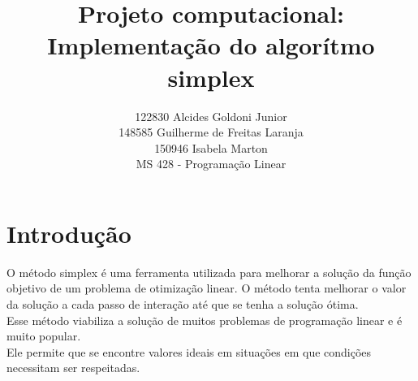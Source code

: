 \documentclass[a4paper]{article}
\title{Projeto computacional: Implementa\c{c}\~ao do algor\'itmo simplex}
\author{122830 Alcides Goldoni Junior\\
		148585 Guilherme de Freitas Laranja\\
		150946 Isabela Marton\\
	\small MS 428 - Programa\c{c}\~ao Linear\\
	}%
\begin{document}
\maketitle
\section{Introdu\c{c}\~ao}
O m\'etodo simplex \'e uma ferramenta utilizada para melhorar a solu\c{c}\~ao da fun\c{c}\~ao objetivo de um problema de otimiza\c{c}\~ao linear. O m\'etodo tenta melhorar o valor da solu\c{c}\~ao a cada passo de intera\c{c}\~ao at\'e que se tenha a solu\c{c}\~ao \'otima.\\
Esse m\'etodo viabiliza a solu\c{c}\~ao de muitos problemas de programa\c{c}\~ao linear e \'e muito popular.\\
Ele permite que se encontre valores ideais em situa\c{c}\~oes em que condi\c{c}\~oes necessitam ser respeitadas.\\
\end{document}
